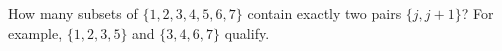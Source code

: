 How many subsets of $\{1,2,3,4,5,6,7\}$ contain exactly two pairs $\{j,j+1\}$? For example, $\{1,2,3,5\}$ and $\{3,4,6,7\}$ qualify.

